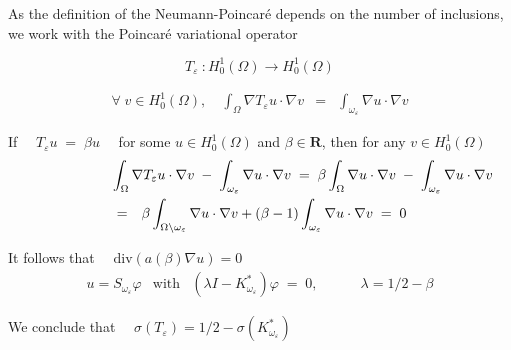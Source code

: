 \documentclass[mathserif,9pt]{beamer}
\def\e{{\varepsilon}}
\def\ds{\displaystyle}
\def\vf{{\varphi}}
\def\R{\mathbf R}
\begin{document}
\begin{frame}
\small{

As the definition of the Neumann-Poincar\'e depends on the number of inclusions,
we work with the Poincar\'e variational operator

\textcolor{ox}{
\[
T_{\e}~: H^1_0(\Omega) \rightarrow H^1_0(\Omega)
\]}
\vspace*{-5mm}

\textcolor{ox}{
\begin{eqnarray*}
\forall\; v \in H^1_0(\Omega), \quad
\int_\Omega \nabla T_\e u \cdot \nabla v
&=&
\int_{\omega_\e} \nabla u \cdot \nabla v
\end{eqnarray*}}
\bigskip

If $\quad T_\e u \;=\; \beta u \quad$ for some $u \in H^1_0(\Omega)$ and $\beta \in \R$,
then for any $v \in H^1_0(\Omega)$
\textcolor{ox}{
\begin{eqnarray*}
\lefteqn{
\ds\int_\Omega \nabla T_\e u \cdot \nabla v
\;-\; \ds\int_{\omega_\e} \nabla u \cdot \nabla v
\;=\; 
\beta \ds\int_\Omega \nabla u \cdot \nabla v
\;-\;\ds\int_{\omega_\e} \nabla u \cdot \nabla v}
\\
&=&
\beta \ds\int_{\Omega \setminus \omega_\e} \nabla u \cdot \nabla v
+ \left(\beta -1 \right) \int_{\omega_\e} \nabla u \cdot \nabla v
\;=\; 0
\end{eqnarray*}}
\medskip

It follows that \textcolor{ox}{$\quad \textrm{div}(a(\beta) \nabla u) = 0$}
\textcolor{ox}{
\begin{eqnarray*}
u = S_{\omega_\e}\vf &\textrm{with}&
(\lambda I - K^*_{\omega_\e}) \vf \;=\; 0,
\quad\quad\quad
\lambda = 1/2 - \beta
\end{eqnarray*}}


We conclude that 
\textcolor{b_bruz}{
$\quad \sigma(T_\e) = 1/2 - \sigma(K^*_{\omega_\e})$ }



}
\end{frame}
\end{document}
